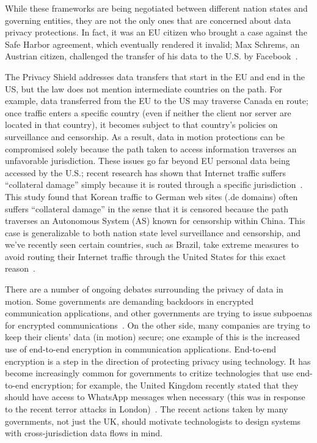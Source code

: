 While these frameworks are being negotiated between different nation states
and governing entities, they are not the only ones that are concerned about
data privacy protections.  In fact, it was an EU citizen who brought a case
against the Safe Harbor agreement, which eventually rendered it invalid; Max
Schrems, an Austrian citizen, challenged the transfer of his data to the U.S.
by Facebook~\cite{schrems}.

The Privacy Shield addresses data transfers that start in the EU and end in
the US, but the law does not mention intermediate countries on the path.  For
example, data transferred from the EU to the US may traverse Canada en route;
once traffic enters a specific country (even if neither the client nor server
are located in that country), it becomes subject to that country's policies on
surveillance and censorship.  As a result, data in motion protections can be
compromised solely because the path taken to access information traverses an
unfavorable jurisdiction.    These issues go far beyond EU personal data being
accessed by the U.S.; recent research has shown that Internet traffic suffers
``collateral damage'' simply because it is routed through a specific
jurisdiction~\cite{levis2012collateral}.  This study found that Korean traffic
to German web sites (.de domains) often suffers ``collateral damage'' in the
sense that it is censored because the path traverses an Autonomous System (AS)
known for censorship within China.  This case is generalizable to both nation
state level surveillance and censorship, and we've recently seen certain
countries, such as Brazil, take extreme measures to avoid routing their
Internet traffic through the United States for this exact
reason~\cite{brazil}.

There are a number of ongoing debates surrounding the privacy of data in motion.  Some governments are demanding backdoors in encrypted communication applications, and other governments are trying to issue subpoenas for encrypted communications~\cite{whatsapp_uk,signal_fbi}.  On the other side, many companies are trying to keep their clients' data (in motion) secure; one example of this is the increased use of end-to-end encryption in communication applications.  End-to-end encryption is a step in the direction of protecting privacy using technology.  It has become increasingly common for governments to critize technologies that use end-to-end encryption; for example, the United Kingdom recently stated that they should have access to WhatsApp messages when necessary (this was in response to the recent terror attacks in London)~\cite{uk_whatsapp}.  The recent actions taken by many governments, not just the UK, should motivate technologists to design systems with cross-jurisdiction data flows in mind.  

